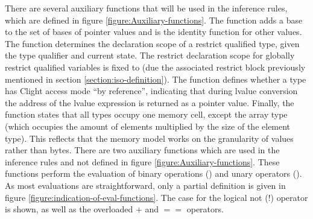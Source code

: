 There are several auxiliary functions that will be used in the inference rules, which are defined in figure \ref{figure:Auxiliary-functions}.
The  function adds a base to the set of bases of pointer values and is the identity function for other values. 
The function  determines the declaration scope of a restrict qualified type,
given the type qualifier and current state.
The restrict declaration scope for globally restrict qualified variables is fixed to  (due the associated restrict block previously
mentioned in section \ref{section:iso-definition}).
The function  defines whether a type has Clight access mode ``by reference'',
indicating that during lvalue conversion the address of the lvalue expression is returned as a pointer value.
Finally, the  function states that all types occupy one memory cell, except the array type
(which occupies the amount of elements multiplied by the size of the element type).
This reflects that the memory model works on the granularity of values rather than bytes.
There are two auxiliary functions which are used in the inference rules and not defined in figure \ref{figure:Auxiliary-functions}.
These functions perform the evaluation of binary operations () and unary operators ().
As most evaluations are straightforward, only a partial definition is given in figure \ref{figure:indication-of-eval-functions}.
The case for the logical not (!) operator is shown, as well as the overloaded $+$ and $\mathbin{==}$ operators.


